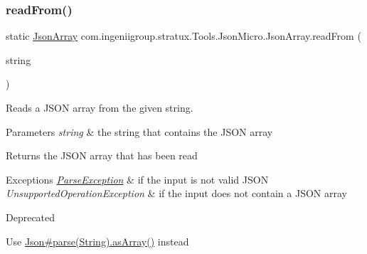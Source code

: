 \subsubsection{\texorpdfstring{read\+From()}{readFrom()}\hspace{0.1cm}{\footnotesize\ttfamily [2/2]}}
{\footnotesize\ttfamily static \hyperlink{classcom_1_1ingeniigroup_1_1stratux_1_1_tools_1_1_json_micro_1_1_json_array}{Json\+Array} com.\+ingeniigroup.\+stratux.\+Tools.\+Json\+Micro.\+Json\+Array.\+read\+From (\begin{DoxyParamCaption}\item[{String}]{string }\end{DoxyParamCaption})\hspace{0.3cm}{\ttfamily [static]}}

Reads a J\+S\+ON array from the given string.


\begin{DoxyParams}{Parameters}
{\em string} & the string that contains the J\+S\+ON array \\
\hline
\end{DoxyParams}
\begin{DoxyReturn}{Returns}
the J\+S\+ON array that has been read 
\end{DoxyReturn}

\begin{DoxyExceptions}{Exceptions}
{\em \hyperlink{classcom_1_1ingeniigroup_1_1stratux_1_1_tools_1_1_json_micro_1_1_parse_exception}{Parse\+Exception}} & if the input is not valid J\+S\+ON \\
\hline
{\em Unsupported\+Operation\+Exception} & if the input does not contain a J\+S\+ON array \\
\hline
\end{DoxyExceptions}
\begin{DoxyRefDesc}{Deprecated}
\item[\hyperlink{deprecated__deprecated000002}{Deprecated}]Use \hyperlink{classcom_1_1ingeniigroup_1_1stratux_1_1_tools_1_1_json_micro_1_1_json_a0d4456dc115b1540337d2475ed2e3d55}{Json\#parse(\+String)}\hyperlink{classcom_1_1ingeniigroup_1_1stratux_1_1_tools_1_1_json_micro_1_1_json_value_a6f56d77a18407a765a64de05048bae54}{.as\+Array()} instead \end{DoxyRefDesc}
\mbox{\label{classcom_1_1ingeniigroup_1_1stratux_1_1_tools_1_1_json_micro_1_1_json_array_aff4b4bba8dde63567970c3a8133322a9}} 
